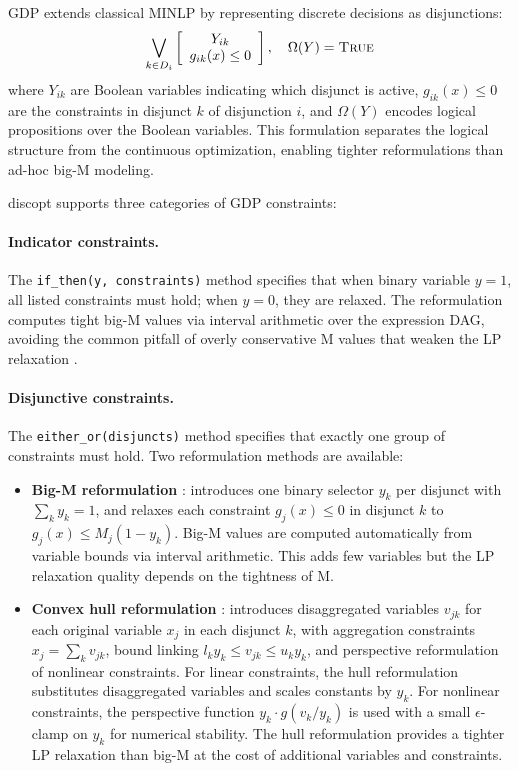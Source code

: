 \documentclass[12pt,preprint]{article}
\begin{document}
GDP extends classical MINLP by representing discrete decisions as disjunctions:
\begin{equation}
\bigvee_{k \in D_i} \left[ \begin{array}{c} Y_{ik} \\ g_{ik}(x) \le 0 \end{array} \right], \quad \Omega(Y) = \textsc{True}
\end{equation}
where $Y_{ik}$ are Boolean variables indicating which disjunct is active, $g_{ik}(x) \le 0$ are the constraints in disjunct $k$ of disjunction $i$, and $\Omega(Y)$ encodes logical propositions over the Boolean variables. This formulation separates the logical structure from the continuous optimization, enabling tighter reformulations than ad-hoc big-M modeling.

discopt supports three categories of GDP constraints:

\paragraph{Indicator constraints.}
The \texttt{if\_then(y, constraints)} method specifies that when binary variable $y = 1$, all listed constraints must hold; when $y = 0$, they are relaxed. The reformulation computes tight big-M values via interval arithmetic over the expression DAG, avoiding the common pitfall of overly conservative M values that weaken the LP relaxation \cite{Trespalacios2015}.

\paragraph{Disjunctive constraints.}
The \texttt{either\_or(disjuncts)} method specifies that exactly one group of constraints must hold. Two reformulation methods are available:

\begin{itemize}
\item \textbf{Big-M reformulation} \cite{Nemhauser1999}: introduces one binary selector $y_k$ per disjunct with $\sum_k y_k = 1$, and relaxes each constraint $g_j(x) \le 0$ in disjunct $k$ to $g_j(x) \le M_j(1 - y_k)$. Big-M values are computed automatically from variable bounds via interval arithmetic. This adds few variables but the LP relaxation quality depends on the tightness of M.

\item \textbf{Convex hull reformulation} \cite{Lee2001,Grossmann2002}: introduces disaggregated variables $v_{jk}$ for each original variable $x_j$ in each disjunct $k$, with aggregation constraints $x_j = \sum_k v_{jk}$, bound linking $l_k y_k \le v_{jk} \le u_k y_k$, and perspective reformulation of nonlinear constraints. For linear constraints, the hull reformulation substitutes disaggregated variables and scales constants by $y_k$. For nonlinear constraints, the perspective function $y_k \cdot g(v_k / y_k)$ is used with a small $\epsilon$-clamp on $y_k$ for numerical stability. The hull reformulation provides a tighter LP relaxation than big-M at the cost of additional variables and constraints.
\end{itemize}
\end{document}
